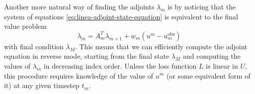 Another more natural way of finding the adjoints $\lambda_m$ is by noticing that the system of equations \eqref{eq:linea-adjoint-state-equation} is equivalent to the final value problem 
\begin{equation}
    \lambda_{m} = A_{m}^T \lambda_{m+1} + w_m(u^m - u_m^\text{obs})
    \label{eq:adjoint-discrete-linear-example}
\end{equation}
with final condition $\lambda_M$. 
This means that we can efficiently compute the adjoint equation in reverse mode, starting from the final state $\lambda_M$ and computing the values of $\lambda_m$ in decreasing index order. 
Unless the loss function $L$ is linear in $U$, this procedure requires knowledge of the value of $u^m$ (or some equivalent form of it) at any given timestep $t_m$. 